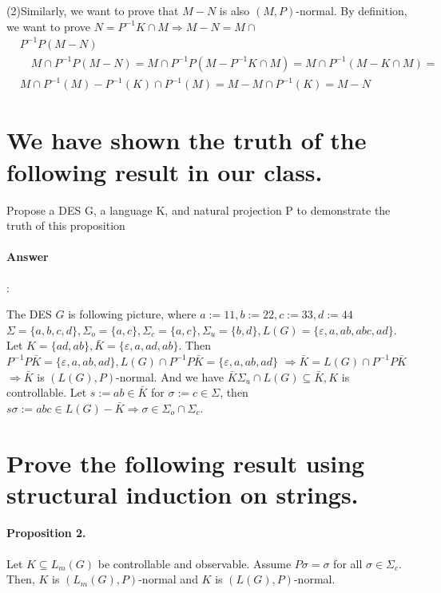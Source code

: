 \documentclass{article}
\begin{document}
(2)Similarly, we want to prove that $M-N$ is also $(M, P)$-normal.
By definition, we want to prove $N=P^{-1} K \cap M \Longrightarrow M-N=M \cap$
$$
\begin{aligned}
& P^{-1} P(M-N) \\
& \quad M \cap P^{-1} P(M-N)=M \cap P^{-1} P\left(M-P^{-1} K \cap M\right)=M \cap P^{-1}(M-K \cap M)= \\
& M \cap P^{-1}(M)-P^{-1}(K) \cap P^{-1}(M)=M-M \cap P^{-1}(K)=M-N
\end{aligned}
$$


\section{We have shown the truth of the following result in our class.}

Propose a DES G, a language K, and natural projection P to demonstrate the truth of this proposition

\paragraph{Answer}:


The DES $G$ is following picture, where $a:=11, b:=22, c:=33, d:=44$ $\Sigma=\{a, b, c, d\}, \Sigma_o=\{a, c\}, \Sigma_c=\{a, c\}, \Sigma_u=\{b, d\}, L(G)=\{\varepsilon, a, a b, a b c, a d\}$. Let $K=\{a d, a b\}, \bar{K}=\{\varepsilon, a, a d, a b\}$.
Then $P^{-1} P \bar{K}=\{\varepsilon, a, a b, a d\}, L(G) \cap P^{-1} P \bar{K}=\{\varepsilon, a, a b, a d\}$ $\Longrightarrow \bar{K}=L(G) \cap P^{-1} P \bar{K}$
$\Longrightarrow \bar{K}$ is $(L(G), P)$-normal.
And we have $\bar{K} \Sigma_u \cap L(G) \subseteq \bar{K}, K$ is controllable. Let $s:=a b \in \bar{K}$ for $\sigma:=c \in \Sigma$, then $s \sigma:=a b c \in L(G)-\bar{K} \Longrightarrow \sigma \in \Sigma_o \cap \Sigma_c$.

\section{Prove the following result using structural induction on strings.}

\paragraph{Proposition 2.} Let $K \subseteq L_m(G)$ be controllable and observable. Assume $P \sigma=\sigma$ for all $\sigma \in \Sigma_c$. Then, $K$ is $\left(L_m(G), P\right)$-normal and $K$ is $(L(G), P)$-normal.
\end{document}
